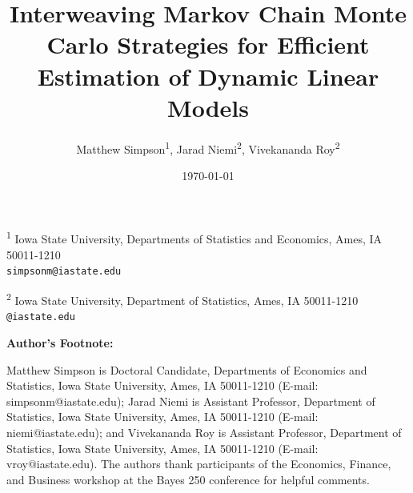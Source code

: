 \documentclass[12pt]{article}
\begin{document}
\title{Interweaving Markov Chain Monte Carlo Strategies for Efficient
Estimation of Dynamic Linear Models}
\author{Matthew Simpson\textsuperscript{1}, Jarad Niemi\textsuperscript{2}, Vivekananda Roy\textsuperscript{2}}
\date{\today}
\maketitle

\begin{center}
 \vspace{-.5em}
 {\small \textsuperscript{1} Iowa State University, Departments of Statistics and Economics, Ames, IA 50011-1210\\[-.3em]
 {\tt simpsonm@iastate.edu}}
 
 \vspace{.5em}

{\small \textsuperscript{2} Iowa State University, Department of Statistics, Ames, IA 50011-1210\\[-.3em]
{\tt <niemi,vroy>@iastate.edu}}

\end{center}


\newpage

\mbox{}
\vspace*{2in}
\begin{center}
\textbf{Author's Footnote:}
\end{center}
Matthew Simpson is Doctoral Candidate, Departments of Economics and Statistics, Iowa State University, Ames, IA 50011-1210 (E-mail: simpsonm@iastate.edu); Jarad Niemi is Assistant Professor, Department of Statistics, Iowa State University, Ames, IA 50011-1210 (E-mail: niemi@iastate.edu); and Vivekananda Roy is Assistant Professor, Department of Statistics, Iowa State University, Ames, IA 50011-1210 (E-mail: vroy@iastate.edu). The authors thank participants of the Economics, Finance, and Business workshop at the Bayes 250 conference for helpful comments. %
\end{document}
